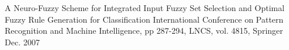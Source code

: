 
\begin{cventries}
  \pubentry
    {A Neuro-Fuzzy Scheme for Integrated Input Fuzzy Set Selection and Optimal Fuzzy Rule Generation for Classification} %
    {International Conference on Pattern Recognition and Machine Intelligence, pp 287-294, LNCS, vol. 4815, Springer}
    {Dec. 2007} %

\end{cventries}
